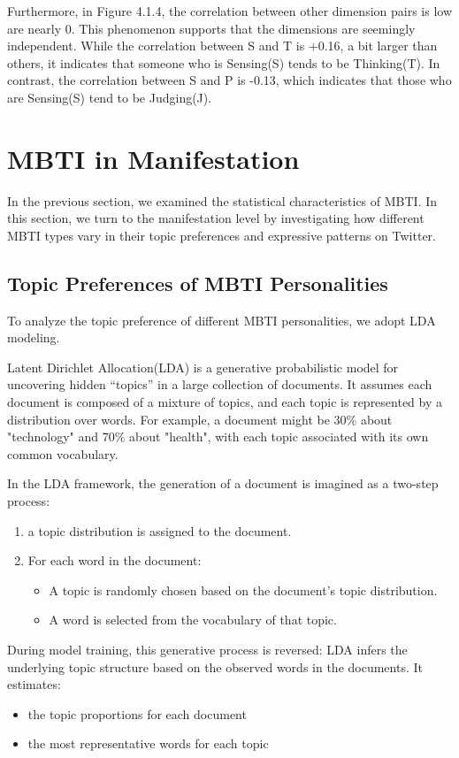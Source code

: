 \documentclass[12pt]{article}
\begin{document}
	Furthermore, in Figure 4.1.4, the correlation between other dimension pairs is low are nearly 0. This phenomenon supports that the dimensions are seemingly independent. While the correlation between S and T is +0.16, a bit larger than others, it indicates that someone who is Sensing(S) tends to be Thinking(T). In contrast, the correlation between S and P is -0.13, which indicates that those who are Sensing(S) tend to be Judging(J).
	\section{MBTI in Manifestation} 
	In the previous section, we examined the statistical characteristics of MBTI. In this section, we turn to the manifestation level by investigating how different MBTI types vary in their topic preferences and expressive patterns on Twitter.	
	
	
	\subsection{Topic Preferences of MBTI Personalities}
	To analyze the topic preference of different MBTI personalities, we adopt LDA modeling.
	
	Latent Dirichlet Allocation(LDA) is a generative probabilistic model for uncovering hidden “topics” in a large collection of documents. It assumes each document is composed of a mixture of topics, and each topic is represented by a distribution over words. For example, a document might be 30\% about "technology" and 70\% about "health", with each topic associated with its own common vocabulary.
	
	In the LDA framework, the generation of a document is imagined as a two-step process:
	\begin{enumerate}
		\item a topic distribution is assigned to the document.
		\item For each word in the document:
		\begin{itemize}
			\item A topic is randomly chosen based on the document’s topic distribution.
			\item A word is selected from the vocabulary of that topic.
		\end{itemize}
	\end{enumerate}
	During model training, this generative process is reversed: LDA infers the underlying topic structure based on the observed words in the documents. It estimates:
	\begin{itemize}
		\item the topic proportions for each document
		\item the most representative words for each topic
	\end{itemize}
	
\end{document}
